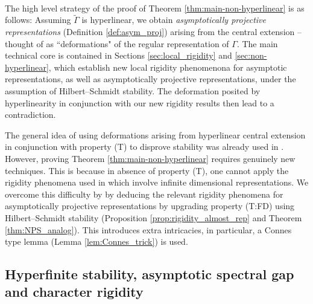 \documentclass[11pt]{amsart}
\DeclareMathOperator{\Sp}{Sp}
\DeclareMathOperator{\SL}{SL}
\DeclareMathOperator{\SU}{SU}
\newcommand{\R}{{\mathbb{R}}}
\newcommand{\Q}{{\mathbb{Q}}}
\theoremstyle{definition}
\theoremstyle{remark}
\theoremstyle{definition}
\begin{document}
\

The high level strategy of the proof of Theorem \ref{thm:main-non-hyperlinear} is as follows: Assuming $\widetilde{\Gamma}$ is hyperlinear, we obtain \emph{asymptotically projective representations} (Definition \ref{def:asym_proj}) arising from the central extension -- thought of as ``deformations" of the regular representation of $\Gamma$.
The main technical core is contained in Sections \ref{sec:local_rigidity} and \ref{sec:non-hyperlinear}, which establish new local rigidity phenomenona for asymptotic representations, as well as asymptotically projective representations, under the assumption of Hilbert--Schmidt stability.
The deformation posited by hyperlinearity in conjunction with our new rigidity results then lead to a contradiction.

The general idea of using deformations arising from hyperlinear central extension in conjunction with property (T) to disprove stability was already used in \cite{ISW,Dog}.
However, proving Theorem \ref{thm:main-non-hyperlinear}  requires genuinely new techniques.
This is because in absence of property (T), one cannot apply the rigidity phenomena used in \cite{ISW} which involve infinite dimensional representations.
We overcome this difficulty by by deducing the relevant rigidity phenomena for asymptotically projective representations by upgrading property (T:FD) using Hilbert--Schmidt stability (Proposition \ref{prop:rigidity_almost_rep} and Theorem \ref{thm:NPS_analog}).
This introduces extra intricacies, in particular, a Connes type lemma  (Lemma \ref{lem:Connes_trick}) is used.

\subsection*{Hyperfinite stability, asymptotic spectral gap and character rigidity}
\end{document}
